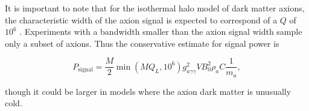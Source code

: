 \documentclass[aps,prl,twocolumn,groupedaddress]{revtex4-1}
\begin{document}

It is important to note that for the isothermal halo model of dark matter axions,  the characteristic width of the axion signal is expected to correspond of a $Q$ of $10^6$ \cite{Cavity_idea}.   Experiments with a bandwidth smaller than the axion signal width sample only a subset of axions.  Thus the conservative estimate for signal power is

\begin{equation}
\label{eqn:sig}
P_{\mathrm{signal}}=\frac{M}{2}\min\left(MQ_L,10^6\right)g_{a\gamma\gamma}^2VB_0^2\rho_aC\frac{1}{m_a},
\end{equation}

though it could be larger in models where the axion dark matter is unusually cold.


                                
%
%
%
%
%
%
%
%
%
%
\end{document}

